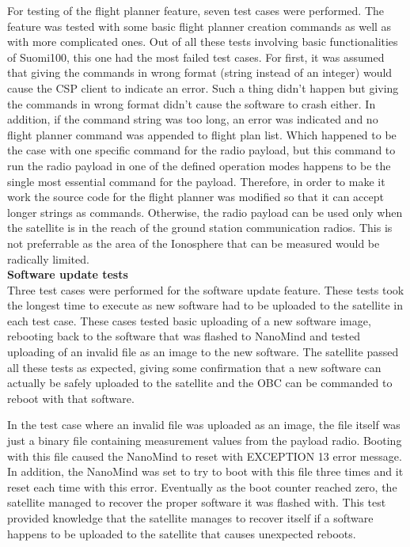 \documentclass[english,12pt,a4paper,pdftex,elec,utf8]{aaltothesis}
\begin{document}
For testing of the flight planner feature, seven test cases were performed. The feature was tested with some basic flight planner creation commands as well as with more complicated ones. Out of all these tests involving basic functionalities of Suomi100, this one had the most failed test cases. For first, it was assumed that giving the commands in wrong format (string instead of an integer) would cause the CSP client to indicate an error. Such a thing didn't happen but giving the commands in wrong format didn't cause the software to crash either. In addition, if the command string was too long, an error was indicated and no flight planner command was appended to flight plan list. Which happened to be the case with one specific command for the radio payload, but this command to run the radio payload in one of the defined operation modes happens to be the single most essential command for the payload. Therefore, in order to make it work the source code for the flight planner was modified so that it can accept longer strings as commands. Otherwise, the radio payload can be used only when the satellite is in the reach of the ground station communication radios. This is not preferrable as the area of the Ionosphere that can be measured would be radically limited.\\
\textbf{Software update tests}
\\ 
Three test cases were performed for the software update feature. These tests took the longest time to execute as new software had to be uploaded to the satellite in each test case. These cases tested basic uploading of a new software image, rebooting back to the software that was flashed to NanoMind and tested uploading of an invalid file as an image to the new software. The satellite passed all these tests as expected, giving some confirmation that a new software can actually be safely uploaded to the satellite and the OBC can be commanded to reboot with that software. \par
In the test case where an invalid file was uploaded as an image, the file itself was just a binary file containing measurement values from the payload radio. Booting with this file caused the NanoMind to reset with EXCEPTION 13 error message. In addition, the NanoMind was set to try to boot with this file three times and it reset each time with this error. Eventually as the boot counter reached zero, the satellite managed to recover the proper software it was flashed with. This test provided knowledge that the satellite manages to recover itself if a software happens to be uploaded to the satellite that causes unexpected reboots.\par
\end{document}
